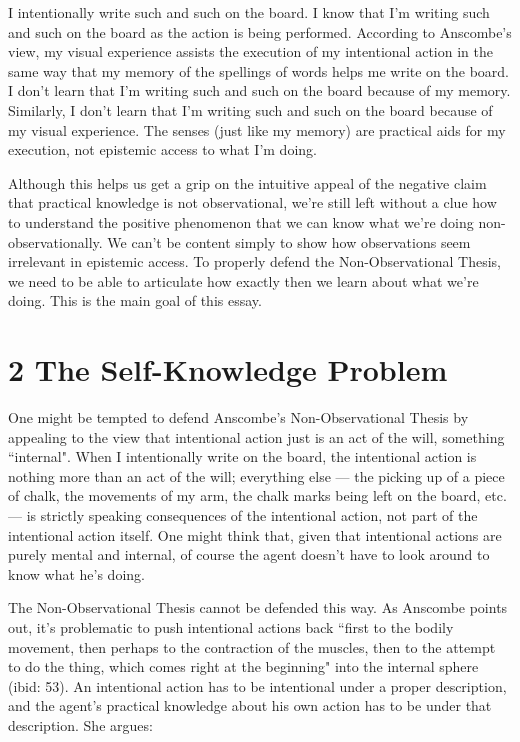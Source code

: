 \documentclass[a4paper,12pt]{article}
\begin{document}
I intentionally write such and such on the board. I know that I'm writing such and such on the board as the action is being performed. According to Anscombe's view, my visual experience assists the execution of my intentional action in the same way that my memory of the spellings of words helps me write on the board. I don't learn that I'm writing such and such on the board because of my memory. Similarly, I don't learn that I'm writing such and such on the board because of my visual experience. The senses (just like my memory) are practical aids for my execution, not epistemic access to what I'm doing.

Although this helps us get a grip on the intuitive appeal of the negative claim that practical knowledge is not observational, we're still left without a clue how to understand the positive phenomenon that we can know what we're doing non-observationally. We can't be content simply to show how observations seem irrelevant in epistemic access. To properly defend the Non-Observational Thesis, we need to be able to articulate how exactly then we learn about what we're doing. This is the main goal of this essay.

\section*{2 The Self-Knowledge Problem}
One might be tempted to defend Anscombe's Non-Observational Thesis by appealing to the view that intentional action just is an act of the will, something ``internal". When I intentionally write on the board, the intentional action is nothing more than an act of the will; everything else --- the picking up of a piece of chalk, the movements of my arm, the chalk marks being left on the board, etc. --- is strictly speaking consequences of the intentional action, not part of the intentional action itself. One might think that, given that intentional actions are purely mental and internal, of course the agent doesn't have to look around to know what he's doing.

The Non-Observational Thesis cannot be defended this way. As Anscombe points out, it's problematic to push intentional actions back ``first to the bodily movement, then perhaps to the contraction of the muscles, then to the attempt to do the thing, which comes right at the beginning" into the internal sphere (ibid: 53). An intentional action has to be intentional under a proper description, and the agent's practical knowledge about his own action has to be under that description. She argues:
\end{document}
